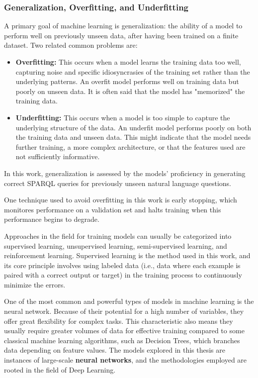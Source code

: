 \subsubsection{Generalization, Overfitting, and Underfitting}
A primary goal of machine learning is generalization: the ability of a model to perform well on previously unseen data, after having been trained on a finite dataset.
Two related common problems are:
\begin{itemize}
    \item \textbf{Overfitting:} This occurs when a model learns the training data too well, capturing noise and specific idiosyncrasies of the training set rather than the underlying patterns. An overfit model performs well on training data but poorly on unseen data. It is often said that the model has "memorized" the training data.
    \item \textbf{Underfitting:} This occurs when a model is too simple to capture the underlying structure of the data. An underfit model performs poorly on both the training data and unseen data. This might indicate that the model needs further training, a more complex architecture, or that the features used are not sufficiently informative.
\end{itemize}
In this work, generalization is assessed by the models' proficiency in generating correct SPARQL queries for previously unseen natural language questions.

One technique used to avoid overfitting in this work is early stopping, which monitores performance on a validation set and halts training when this performance begins to degrade.

Approaches in the field for training models can usually be categorized into supervised learning, unsupervised learning, semi-supervised learning, and reinforcement learning. 
Supervised learning is the method used in this work, and its core principle involves using labeled data (i.e., data where each example is paired with a correct output or target) in the training process to continuously minimize the errors. 

One of the most common and powerful types of models in machine learning is the neural network. Because of their potential for a high number of variables, they offer great flexibility for complex tasks. This characteristic also means they usually require greater volumes of data for effective training compared to some classical machine learning algorithms, such as Decision Trees, which branches data depending on feature values. 
The models explored in this thesis are instances of large-scale \textbf{neural networks}, and the methodologies employed are rooted in the field of Deep Learning.

